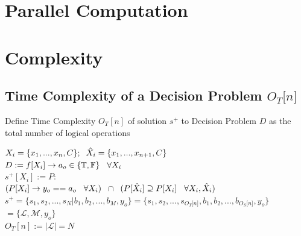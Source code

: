 \documentclass[11pt]{article}
\begin{document}
\section*{Parallel Computation}






\section{Complexity}

\subsection{Time Complexity of a Decision Problem $O_T \lbrack n \rbrack$}
Define Time Complexity $O_T [n]$ of solution $s^+$ to Decision Problem $D$ as the total number of logical operations
\begin{center}
\vspace{1mm}
$
X_i = \{x_1,...,x_n,C\}; \hspace{2mm} \hat{X}_i = \{x_1,...,x_{n+1},C\}
$
\\ \vspace{4mm}
$
D := f \lbrack X_i \rbrack \rightarrow a_{o} \in \{\mathbb{T}, \mathbb{F}\} \hspace{3mm} \forall X_i
$
\\ \vspace{4mm}
$
s^+[X_i] := P :
$
\\ \vspace{2mm}
$
(P \lbrack X_i \rbrack \rightarrow y_{o} == a_{o} \hspace{3mm} \forall X_i) \hspace{2mm} \cap \hspace{2mm} (P[\hat{X}_i] \supseteq P[X_i] \hspace{3mm} \forall X_i,\hat{X}_i)
$
\\ \vspace{4mm}
$
s^+ = \{ s_1,s_2,...,s_N|b_1,b_2,...,b_M,y_o\} = \{ s_1,s_2,...,s_{O_T \lbrack n \rbrack }, b_1, b_2,...,b_{O_S \lbrack n \rbrack},y_o \}
$
\\ \vspace{2mm}
$
= \{ \mathcal{L},\mathcal{M},y_o\}
$
\\ \vspace{3mm}
$
O_T[n] := |\mathcal{L}| = N
$
\end{center}
\end{document}
